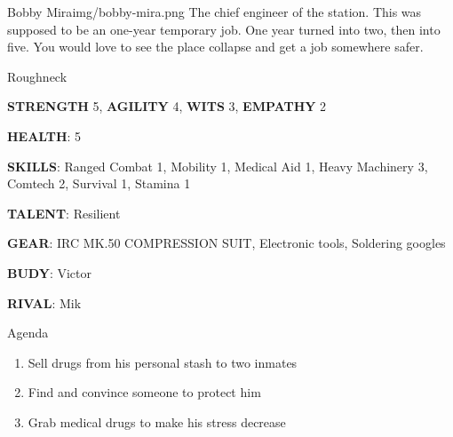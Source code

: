 
\begin{rpg-pcbox}{Bobby Mira}{img/bobby-mira.png}
    The chief engineer of the station. This was supposed to be an one-year temporary job. One year turned into two, then into five. You would love to see the place collapse and get a job somewhere safer.
\end{rpg-pcbox}

\begin{rpg-commentbox}{}
    Roughneck

    \textbf{STRENGTH} 5, \textbf{AGILITY} 4, \textbf{WITS} 3, \textbf{EMPATHY} 2

    \textbf{HEALTH}: 5

    \textbf{SKILLS}: Ranged Combat 1, Mobility 1, Medical Aid 1, Heavy Machinery 3, Comtech 2, Survival 1, Stamina 1
    
    \textbf{TALENT}: Resilient
    
    \textbf{GEAR}: IRC MK.50 COMPRESSION SUIT, Electronic tools, Soldering googles

    
    \textbf{BUDY}: Victor
    
    \textbf{RIVAL}: Mik
\end{rpg-commentbox}


\begin{rpg-commentbox}{Agenda}
    \begin{enumerate}[label=\textbf{Act \arabic*}, leftmargin=1cm]
        \item Sell drugs from his personal stash to two inmates
        \item Find and convince someone to protect him
        \item Grab medical drugs to make his stress decrease
    \end{enumerate}
\end{rpg-commentbox}


